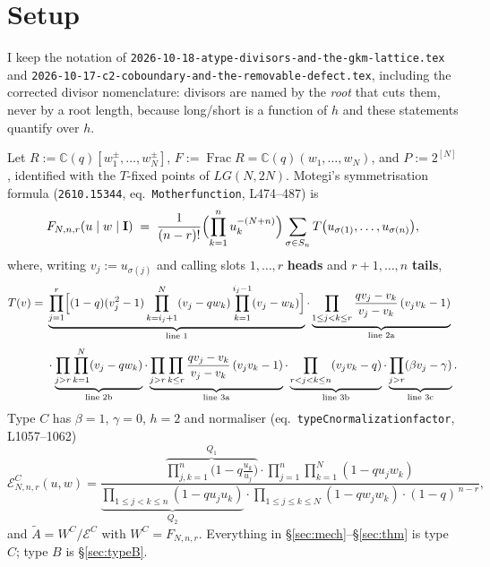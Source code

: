 \documentclass[11pt]{article}
\theoremstyle{definition}
\newcommand{\At}{\widetilde{A}}
\newcommand{\bI}{\mathbf{I}}
\begin{document}
\section{Setup}
\label{sec:setup}

I keep the notation of \texttt{2026-10-18-atype-divisors-and-the-gkm-lattice.tex}
and \texttt{2026-10-17-c2-coboundary-and-the-removable-defect.tex}, including the
corrected divisor nomenclature: divisors are named by the \emph{root} that cuts
them, never by a root length, because long/short is a function of $h$ and these
statements quantify over $h$.

Let $R:=\mathbb{C}(q)[w_1^{\pm},\dots,w_N^{\pm}]$, $F:=\operatorname{Frac}R
=\mathbb{C}(q)(w_1,\dots,w_N)$, and $P:=2^{[N]}$, identified with the $T$-fixed
points of $LG(N,2N)$.  Motegi's symmetrisation formula
(\texttt{2610.15344}, eq.\ \texttt{Motherfunction}, L474--487) is
\begin{equation}\label{eq:mother}
   F_{N,n,r}(u\mid w\mid\bI)
   \;=\;\frac{1}{(n-r)!}\Bigl(\prod_{k=1}^{n}u_k^{-(N+n)}\Bigr)
     \sum_{\sigma\in S_n}T\bigl(u_{\sigma(1)},\dots,u_{\sigma(n)}\bigr),
\end{equation}
where, writing $v_j:=u_{\sigma(j)}$ and calling slots $1,\dots,r$ \textbf{heads}
and $r+1,\dots,n$ \textbf{tails},
\begin{equation}\label{eq:T}
\begin{aligned}
T(v)=\;&\underbrace{\prod_{j=1}^{r}\Bigl[(1-q)(v_j^2-1)
   \prod_{k=i_j+1}^{N}(v_j-qw_k)\prod_{k=1}^{i_j-1}(v_j-w_k)\Bigr]}_{\text{line 1}}
   \cdot\underbrace{\prod_{1\le j<k\le r}\frac{qv_j-v_k}{v_j-v_k}\,(v_jv_k-1)}_{\text{line 2a}}\\[1mm]
   &\cdot\underbrace{\prod_{j>r}\prod_{k=1}^{N}(v_j-qw_k)}_{\text{line 2b}}
   \cdot\underbrace{\prod_{j>r}\prod_{k\le r}\frac{qv_j-v_k}{v_j-v_k}\,(v_jv_k-1)}_{\text{line 3a}}
   \cdot\underbrace{\prod_{r<j<k\le n}(v_jv_k-q)}_{\text{line 3b}}
   \cdot\underbrace{\prod_{j>r}(\beta v_j-\gamma)}_{\text{line 3c}} .
\end{aligned}
\end{equation}
Type $C$ has $\beta=1$, $\gamma=0$, $h=2$ and normaliser
(eq.\ \texttt{typeCnormalizationfactor}, L1057--1062)
\begin{equation}\label{eq:EC}
  \mathcal{E}^{C}_{N,n,r}(u,w)=
  \frac{\overbrace{\prod_{j,k=1}^{n}\bigl(1-q\tfrac{u_k}{u_j}\bigr)}^{\textstyle Q_1}
        \cdot\prod_{j=1}^{n}\prod_{k=1}^{N}(1-qu_jw_k)}
       {\underbrace{\prod_{1\le j<k\le n}(1-qu_ju_k)}_{\textstyle Q_2}
        \cdot\prod_{1\le j\le k\le N}(1-qw_jw_k)\cdot(1-q)^{\,n-r}} ,
\end{equation}
and $\At=W^{C}/\mathcal{E}^{C}$ with $W^{C}=F_{N,n,r}$.  Everything in
\S\ref{sec:mech}--\S\ref{sec:thm} is type $C$; type $B$ is \S\ref{sec:typeB}.
\end{document}

